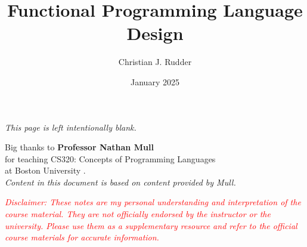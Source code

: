 \documentclass{memoir}
\title{Functional Programming Language Design}
\author{Christian J. Rudder}
\date{January 2025}
\begin{document}
\maketitle
\setcounter{secnumdepth}{2} %
\setcounter{tocdepth}{2}

\tableofcontents

\newpage
\thispagestyle{empty}
\mbox{}
\vfill
\begin{center}
    \textit{This page is left intentionally blank.}
\end{center}
\vfill
\newpage
\thispagestyle{empty}
\mbox{}
\vfill
\begin{center}
    \Large{Big thanks to \textbf{Professor Nathan Mull}}\\
    \normalsize 
    for teaching CS320: Concepts of Programming Languages\\
    at Boston University \cite{mull_cs320}.\\
    \textit{Content in this document is based on content provided by Mull.}\\
    \vfill
    \begin{center}
        \textcolor{red}{\textit{Disclaimer: These notes are my personal understanding and interpretation of the course material. 
        They are not officially endorsed by the instructor or the university. Please use them as a supplementary resource and refer 
        to the official course materials for accurate information.}}
    \end{center}
\end{center}

\vfill

% 

% 
% 
% 
% 

% 
\end{document}
